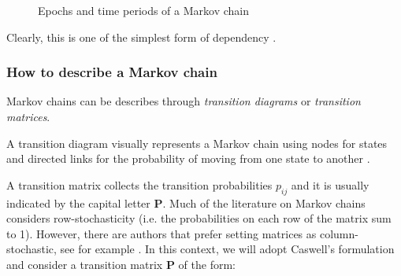 \documentclass[\main/main.tex]{subfiles}
\begin{document}
\begin{figure}[H]
\centering
{}
\caption{Epochs and time periods of a Markov chain}
\label{fig:markov_chain}
\end{figure}







Clearly, this is one of the simplest form of dependency \citep{Sheskin2010}. 




\subsubsection{How to describe a Markov chain}

Markov chains can be describes through \textit{transition diagrams} or \textit{transition matrices}.

A transition diagram visually represents a Markov chain using nodes for states and directed links for the probability of moving from one state to another \citep{Gagniuc2017}. 

A transition matrix collects the transition probabilities $p_{ij}$ and it is usually indicated by the capital letter $\mathbf{P}$. 
Much of the literature on Markov chains considers row-stochasticity (i.e. the probabilities on each row of the matrix sum to 1). However, there are authors that prefer setting matrices as column-stochastic, see for example \cite{Caswell2006}. In this context, we will adopt Caswell's formulation and consider a transition matrix $\mathbf{P}$ of the form:
\end{document}
